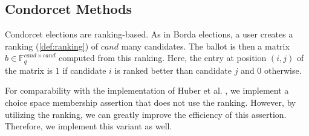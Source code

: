 \subsection{Condorcet Methods}
\label{subsection:ourVotingSchemes:condorcet}
Condorcet elections are ranking-based.
As in Borda elections, a user creates a ranking (\cref{def:ranking}) of $cand$ many candidates.
The ballot is then a matrix $b\in\mathbb{F}_q^{cand\times cand}$ computed from this ranking.
Here, the entry at position $(i,j)$ of the matrix is $1$ if candidate $i$ is ranked better than candidate $j$ and $0$ otherwise.

For comparability with the implementation of Huber et al. \cite{huber_hicolasnuberballotsnarks_2024}, we implement a choice space membership assertion that does not use the ranking.
However, by utilizing the ranking, we can greatly improve the efficiency of this assertion.
Therefore, we implement this variant as well.

